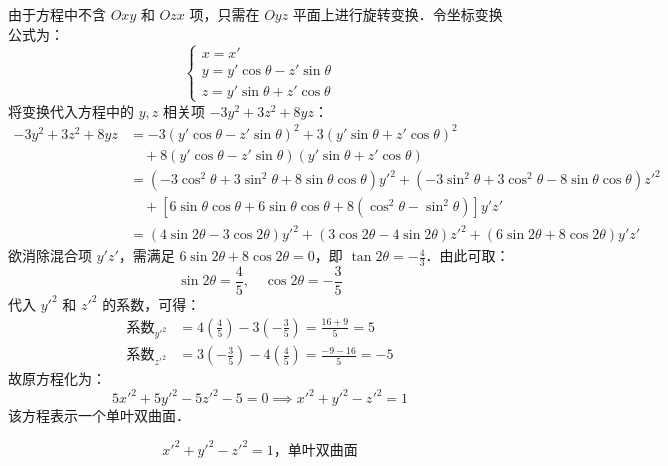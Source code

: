 \begin{solution}
    由于方程中不含 $Oxy$ 和 $Ozx$ 项，只需在 $Oyz$ 平面上进行旋转变换．令坐标变换公式为：
    \begin{equation}
        \begin{cases}
            x = x'                              \\
            y = y' \cos \theta - z' \sin \theta \\
            z = y' \sin \theta + z' \cos \theta
        \end{cases}
    \end{equation}
    将变换代入方程中的 $y, z$ 相关项 $-3y^2 + 3z^2 + 8yz$：
    \begin{equation}
        \begin{aligned}
            -3y^2 + 3z^2 + 8yz & = -3(y' \cos \theta - z' \sin \theta)^2 + 3(y' \sin \theta + z' \cos \theta)^2                                                            \\
                               & \quad + 8(y' \cos \theta - z' \sin \theta)(y' \sin \theta + z' \cos \theta)                                                               \\
                               & = (-3\cos^2 \theta + 3\sin^2 \theta + 8\sin \theta \cos \theta) y'^2 + (-3\sin^2 \theta + 3\cos^2 \theta - 8\sin \theta \cos \theta) z'^2 \\
                               & \quad + [6\sin \theta \cos \theta + 6\sin \theta \cos \theta + 8(\cos^2 \theta - \sin^2 \theta)] y'z'                                     \\
                               & = (4\sin 2\theta - 3\cos 2\theta) y'^2 + (3\cos 2\theta - 4\sin 2\theta) z'^2 + (6\sin 2\theta + 8\cos 2\theta) y'z'
        \end{aligned}
    \end{equation}
    欲消除混合项 $y'z'$，需满足 $6\sin 2\theta + 8\cos 2\theta = 0$，即 $\tan 2\theta = -\frac{4}{3}$．由此可取：
    \begin{equation}
        \sin 2\theta = \frac{4}{5}, \quad \cos 2\theta = -\frac{3}{5}
    \end{equation}
    代入 $y'^2$ 和 $z'^2$ 的系数，可得：
    \begin{equation}
        \begin{aligned}
            \text{系数}_{y'^2} & = 4 \left( \frac{4}{5} \right) - 3 \left( -\frac{3}{5} \right) = \frac{16 + 9}{5} = 5   \\
            \text{系数}_{z'^2} & = 3 \left( -\frac{3}{5} \right) - 4 \left( \frac{4}{5} \right) = \frac{-9 - 16}{5} = -5
        \end{aligned}
    \end{equation}
    故原方程化为：
    \begin{equation}
        5x'^2 + 5y'^2 - 5z'^2 - 5 = 0 \implies x'^2 + y'^2 - z'^2 = 1
    \end{equation}
    该方程表示一个单叶双曲面．

    \begin{equation}
        \boxed{x'^2 + y'^2 - z'^2 = 1，\text{单叶双曲面}}
    \end{equation}
\end{solution}


